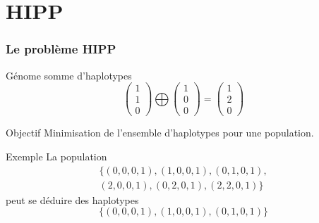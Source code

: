 \documentclass{beamer}
\begin{document}
\section{HIPP}
\begin{frame}
    \frametitle{Le problème HIPP}
    \begin{block}{Génome somme d'haplotypes}
            \[ \left(\begin{array}{c} 1 \\ 1 \\ 0 \end{array}\right) \bigoplus \left(\begin{array}{c} 1 \\ 0 \\ 0\end{array}\right) =
                \left(\begin{array}{c} 1 \\ 2 \\ 0 \end{array}\right) \]
    \end{block}
    \begin{block}{Objectif}
        Minimisation de l'ensemble d'haplotypes pour une population.
    \end{block}
    \begin{exampleblock}{Exemple}
        La population
        \[\begin{array}{c} \{(0,0,0,1),(1,0,0,1),(0,1,0,1), \\ (2,0,0,1),(0,2,0,1),(2,2,0,1)\}\end{array} \]
        peut se déduire des haplotypes
        \[\{(0,0,0,1),(1,0,0,1),(0,1,0,1)\}\]
    \end{exampleblock}


\end{frame}
\end{document}
